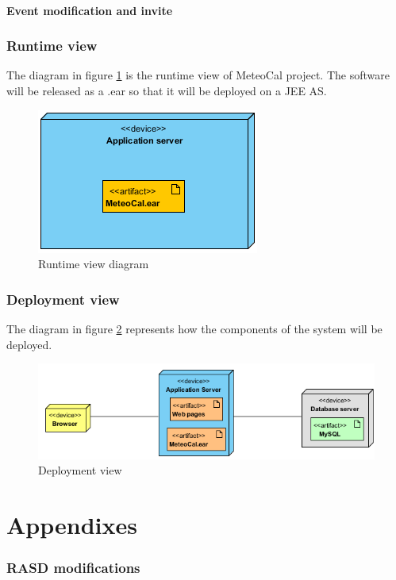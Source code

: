 \documentclass[10pt,a4paper,titlepage]{article}
\begin{document}
\subsection{Event modification and invite}

\section{Runtime view}
The diagram in figure \ref{fig:runtime_view} is the runtime view of MeteoCal project. The software will be released as a .ear so that it will be deployed on a JEE AS.
\begin{figure}[h]
\centering
\includegraphics[width=0.5\linewidth]{./images/runtime_view}
\caption[runtime view]{Runtime view diagram}
\label{fig:runtime_view}
\end{figure}

\section{Deployment view}
The diagram in figure \ref{fig:deployment_view} represents how the components of the system will be deployed.
\begin{figure}[h]
\centering
\includegraphics[width=\linewidth]{./images/deployment_view}
\caption[deploy]{Deployment view}
\label{fig:deployment_view}
\end{figure}

\clearpage
\part{Appendixes}
\label{part:appendixes}
\section{RASD modifications}
\end{document}
